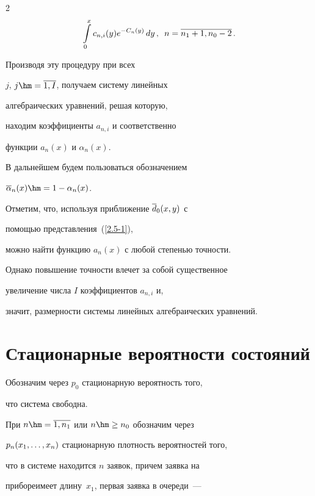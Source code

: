 \begin{multicols}{2}
\begin{multline*}
\int\limits_0^x c_{n,i}(y) e^{- C_n(y)}  \,dy\,,


\enskip n=\overline{n_1+1,n_0-2}\,.


\end{multline*}




Производя эту процедуру при всех


$j$, $j\hm=\overline{1,I}$, получаем систему линейных


ал\-геб\-ра\-и\-че\-ских уравнений, решая которую,


находим коэффициенты $a_{n,i}$ и соответственно


функции $a_{n}(x)$ и $\alpha_{n}(x)$.





В дальнейшем будем пользоваться обозначением


$\oa_n(x) \hm= 1 - \alpha_n(x)$.








Отметим, что, используя приближение $\overline d_0(x,y)$ с


помощью представления~(\ref{2.5-1}), 


можно найти функцию $a_{n}(x)$ с любой степенью точности.


Однако повышение точности влечет за собой существенное


увеличение числа $I$ коэффициентов $a_{n,i}$ и, 


значит, размерности системы линейных алгебраических уравнений.





\section{Стационарные вероятности состояний}





Обозначим через $p_0$ стационарную вероятность того,


что система свободна.


При $n\hm=\overline{1,n_1}$ или $n\hm\ge n_0$ обозначим через


$p_n(x_1,\ldots,x_n)$ стационарную плот\-ность вероятностей того,


что в системе находится $n$ заявок, причем заявка на


приборе\linebreak имеет длину~$x_1$, первая заявка в очереди~---



\end{multicols}
